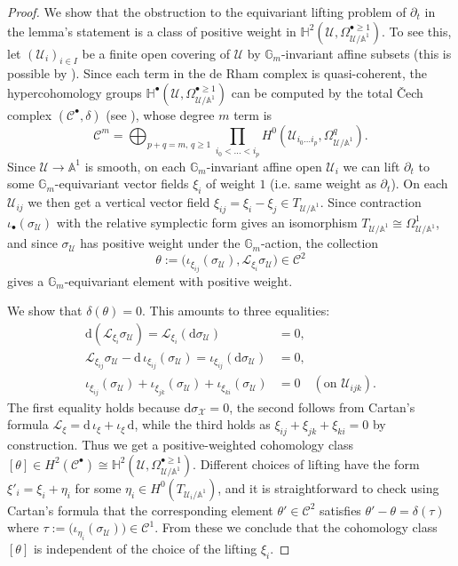\documentclass[12pt]{amsart}
\theoremstyle{definition}
\newcommand{\bA}{\mathbb{A}}
\newcommand{\bG}{\mathbb{G}}
\newcommand{\cL}{\mathcal{L}}
\newcommand{\scX}{\mathscr{X}}
\newcommand{\rd}{\mathrm{d}}
\numberwithin{equation}{section}
\begin{document}
\begin{proof}
We show that the obstruction to the equivariant lifting problem of $\partial_t$ in the lemma's statement is a class of positive weight in $\mathbb{H}^2(\mathscr{U},\Omega_{\mathscr{U}/\bA^1}^{\bullet\ge 1})$. To see this, let $(\mathscr{U}_i)_{i\in I}$ be a finite open covering of $\mathscr{U}$ by $\bG_m$-invariant affine subsets (this is possible by \cite{Sumihiro}). Since each term in the de Rham complex is quasi-coherent, the hypercohomology groups $\mathbb{H}^\bullet(\mathscr{U},\Omega_{\mathscr{U}/\bA^1}^{\bullet\ge 1})$ can be computed by the total \v{C}ech complex $(\mathscr{C}^\bullet,\delta)$ \cite[\href{https://stacks.math.columbia.edu/tag/01FP}{Tag 01FP}]{stacks-project} (see \cite[Proof of Proposition 8]{Namikawa-deformation-terminal}), whose degree $m$ term is
\[
\mathscr{C}^m = \bigoplus_{p+q=m,\,q\ge 1} \prod_{i_0<\dots<i_p} H^0(\mathscr{U}_{i_0\dots i_p},\Omega_{\mathscr{U}/\bA^1}^q). 
\]
Since $\mathscr{U}\to \bA^1$ is smooth, on each $\bG_m$-invariant affine open $\mathscr{U}_i$ we can lift $\partial_t$ to some $\bG_m$-equivariant vector fields $\xi_i$ of weight $1$ (i.e. same weight as $\partial_t$). On each $\mathscr{U}_{ij}$ we then get a vertical vector field $\xi_{ij}=\xi_i - \xi_j \in T_{\mathscr{U}/\bA^1}$. Since contraction $\iota_{\bullet}(\sigma_{\mathscr{U}})$ with the relative symplectic form gives an isomorphism $T_{\mathscr{U}/\bA^1}\cong \Omega^1_{\mathscr{U}/\bA^1}$, and since $\sigma_{\mathscr{U}}$ has positive weight under the $\bG_m$-action, the collection
\[
\theta:=\big( \iota_{\xi_{ij}}(\sigma_{\mathscr{U}}), \cL_{\xi_i} \sigma_{\mathscr{U}}\big) \in \mathscr{C}^2
\]
gives a $\bG_m$-equivariant element with positive weight. 

We show that $\delta(\theta)=0$. This amounts to three equalities:
\begin{align*}
\rd (\cL_{\xi_i} \sigma_{\mathscr{U}}) = \cL_{\xi_i} (\rd \sigma_{\mathscr{U}}) & = 0, \\
\cL_{\xi_{ij}} \sigma_{\mathscr{U}} - \rd\, \iota_{\xi_{ij}}(\sigma_{\mathscr{U}}) = \iota_{\xi_{ij}}(\rd  \sigma_{\mathscr{U}}) & = 0, \\
\iota_{\xi_{ij}}(\sigma_{\mathscr{U}}) +  \iota_{\xi_{jk}}(\sigma_{\mathscr{U}}) + \iota_{\xi_{ki}}(\sigma_{\mathscr{U}}) & = 0 \quad (\mbox{on }\mathscr{U}_{ijk}).
\end{align*}
The first equality holds because $\rd \sigma_{\scX}=0$, the second follows from Cartan's formula $\cL_\xi = \rd\, \iota_\xi+\iota_\xi\, \rd$, while the third holds as $\xi_{ij}+\xi_{jk}+\xi_{ki}=0$ by construction. Thus we get a positive-weighted cohomology class $[\theta]\in H^2(\mathscr{C}^\bullet)\cong \mathbb{H}^2(\mathscr{U},\Omega_{\mathscr{U}/\bA^1}^{\bullet\ge 1})$. Different choices of lifting have the form $\xi'_i=\xi_i+\eta_i$ for some $\eta_i\in H^0(T_{\mathscr{U}_i/\bA^1})$, and it is straightforward to check using Cartan's formula that the corresponding element $\theta'\in \mathscr{C}^2$ satisfies $\theta'-\theta = \delta(\tau)$ where $\tau:=\big(\iota_{\eta_i}(\sigma_{\mathscr{U}})\big)\in \mathscr{C}^1$. From these we conclude that the cohomology class $[\theta]$ is independent of the choice of the lifting $\xi_i$. 


\end{proof}
\end{document}
